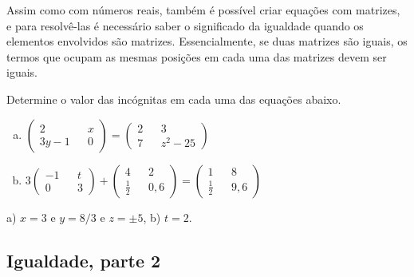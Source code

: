 \documentclass[main_estudante.tex]{subfiles}
\begin{document}
Assim como com números reais, também é possível criar equações com matrizes, e para resolvê-las  é necessário saber o significado da igualdade quando os elementos envolvidos são matrizes. Essencialmente, se duas matrizes são iguais, os termos que ocupam as mesmas posições em cada uma das matrizes devem ser iguais.

\begin{questao}
Determine o valor das incógnitas em cada uma das equações abaixo.
\begin{enumerate}[a)]
\item $\begin{pmatrix} 2 && x \\ 3y-1 && 0 \end{pmatrix} = \begin{pmatrix} 2 && 3 \\ 7 && z^2-25 \end{pmatrix}$
\item $ 3 \begin{pmatrix} -1 && t \\ 0 && 3 \end{pmatrix} + \begin{pmatrix} 4 && 2 \\ \frac{1}{2} && 0,6 \end{pmatrix} = \begin{pmatrix} 1 && 8 \\ \frac{1}{2} && 9,6 \end{pmatrix} $
\end{enumerate}
\end{questao}

\begin{gabarito}
	\begin{gabaritoQuestao}
		a) $x=3$ e $y=8/3$ e $z= \pm 5$, b) $t=2$.
	\end{gabaritoQuestao}
\end{gabarito}

\subsection*{Igualdade, parte 2}
\end{document}

